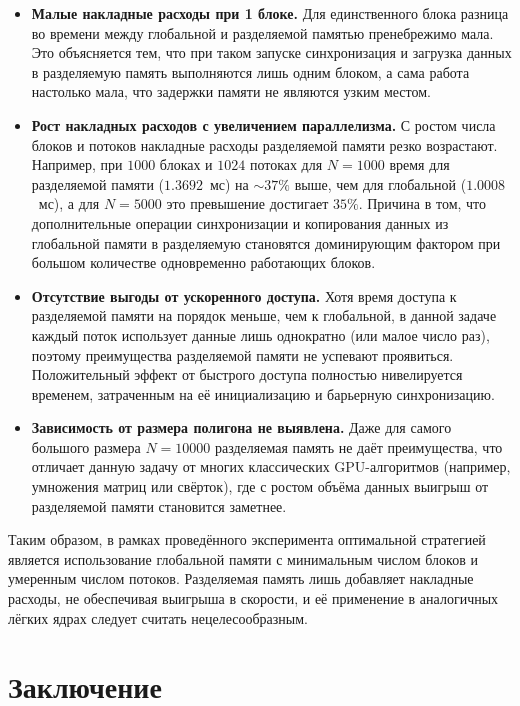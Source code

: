 \documentclass{article}[14pt]
\begin{document}
\begin{itemize}
    \item \textbf{Малые накладные расходы при 1 блоке.}  
    Для единственного блока разница во времени между глобальной и разделяемой памятью пренебрежимо мала.  
    Это объясняется тем, что при таком запуске синхронизация и загрузка данных в разделяемую память выполняются лишь одним блоком, а сама работа настолько мала, что задержки памяти не являются узким местом.

    \item \textbf{Рост накладных расходов с увеличением параллелизма.}  
    С ростом числа блоков и потоков накладные расходы разделяемой памяти резко возрастают.  
    Например, при $1000$ блоках и $1024$ потоках для $N=1000$ время для разделяемой памяти ($1.3692$~мс) на $\sim37\%$ выше, чем для глобальной ($1.0008$~мс), а для $N=5000$ это превышение достигает $35\%$.  
    Причина в том, что дополнительные операции синхронизации и копирования данных из глобальной памяти в разделяемую становятся доминирующим фактором при большом количестве одновременно работающих блоков.

    \item \textbf{Отсутствие выгоды от ускоренного доступа.}  
    Хотя время доступа к разделяемой памяти на порядок меньше, чем к глобальной, в данной задаче каждый поток использует данные лишь однократно (или малое число раз), поэтому преимущества разделяемой памяти не успевают проявиться.  
    Положительный эффект от быстрого доступа полностью нивелируется временем, затраченным на её инициализацию и барьерную синхронизацию.

    \item \textbf{Зависимость от размера полигона не выявлена.}  
    Даже для самого большого размера $N=10000$ разделяемая память не даёт преимущества, что отличает данную задачу от многих классических GPU-алгоритмов (например, умножения матриц или свёрток), где с ростом объёма данных выигрыш от разделяемой памяти становится заметнее.
\end{itemize}

Таким образом, в рамках проведённого эксперимента оптимальной стратегией является использование глобальной памяти с минимальным числом блоков и умеренным числом потоков.  
Разделяемая память лишь добавляет накладные расходы, не обеспечивая выигрыша в скорости, и её применение в аналогичных лёгких ядрах следует считать нецелесообразным.

\pagebreak

\section*{Заключение}
\end{document}
